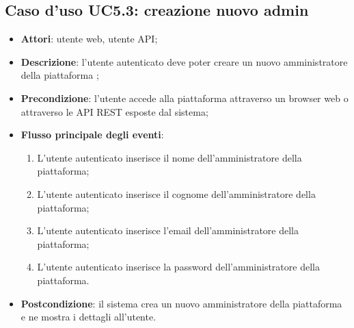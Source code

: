 \subsection{Caso d'uso UC5.3: creazione nuovo admin}
\begin{itemize}
\item \textbf{Attori}: utente web, utente API;
\item \textbf{Descrizione}: l'utente autenticato deve poter creare un nuovo amministratore della piattaforma ; 
      \item \textbf{Precondizione}: l'utente accede alla piattaforma attraverso un browser web o attraverso le API REST esposte dal sistema;

        \item \textbf{Flusso principale degli eventi}:
          \begin{enumerate}
          \item L'utente autenticato inserisce il nome dell'amministratore della piattaforma;
          \item L'utente autenticato inserisce il cognome dell'amministratore della piattaforma;
          \item L'utente autenticato inserisce l'email dell'amministratore della piattaforma;
          \item L'utente autenticato inserisce la password dell'amministratore della piattaforma.

      \end{enumerate}
    \item \textbf{Postcondizione}: il sistema crea un nuovo amministratore della piattaforma e ne mostra i dettagli all'utente.
  \end{itemize}
\hypertarget{UC5.4}{}
